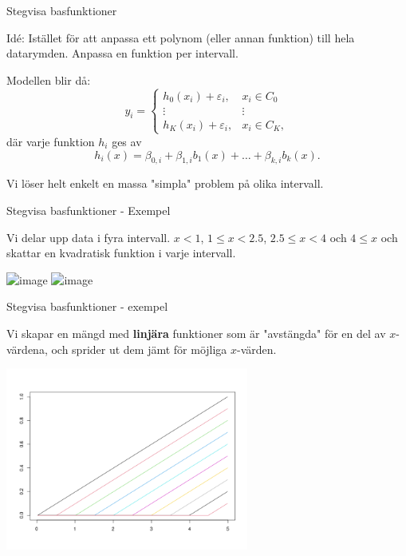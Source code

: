 \documentclass[10pt,english]{beamer}
\begin{document}
\begin{frame}{Stegvisa basfunktioner}

    \begin{greenbox}
        Idé: Istället för att anpassa ett polynom (eller annan funktion) till hela datarymden. Anpassa en funktion per intervall.
    \end{greenbox}

    Modellen blir då:
    \begin{equation*}
        y_i = \begin{cases}
            h_0(x_i) + \varepsilon_i, & x_i \in C_0 \\
            \vdots & \vdots \\
            h_K(x_i) + \varepsilon_i, & x_i \in C_K,
        \end{cases}
    \end{equation*}
    där varje funktion $h_i$ ges av
    \begin{equation*}
        h_i(x) = \beta_{0,i} + \beta_{1,i} b_1(x) + \ldots + \beta_{k,i} b_k(x).
    \end{equation*}

    Vi löser helt enkelt en massa "simpla" problem på olika intervall.
    
\end{frame}

\begin{frame}{Stegvisa basfunktioner - Exempel}

    Vi delar upp data i fyra intervall. $x<1$, $1 \leq x < 2.5$, $ 2.5 \leq x < 4$ och $4 \leq x$ och skattar en kvadratisk funktion i varje intervall.

    \includegraphics<1>[width=\textwidth]{figs/nonLinGG.png}
    \includegraphics<2>[width=\textwidth]{figs/nonLinPieceQuad.png}
    
\end{frame}


\begin{frame}{Stegvisa basfunktioner - exempel}

Vi skapar en mängd med \textbf{linjära} funktioner som är "avstängda" för en del av $x$-värdena, 
och sprider ut dem jämt för möjliga $x$-värden.

\includegraphics[width=0.6\textwidth]{figs/linear_trunc_power_basis.png}


\end{frame}
\end{document}
